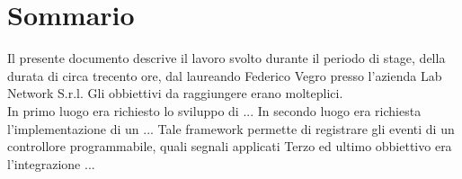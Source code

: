 
\cleardoublepage
{}
{}
\begingroup
\let\clearpage\relax
\let\cleardoublepage\relax
\let\cleardoublepage\relax

\chapter*{Sommario}

Il presente documento descrive il lavoro svolto durante il periodo di stage, della durata di circa trecento ore, dal laureando Federico Vegro presso l'azienda Lab Network S.r.l.
Gli obbiettivi da raggiungere erano molteplici.\\
In primo luogo era richiesto lo sviluppo di ...
In secondo luogo era richiesta l'implementazione di un ... 
Tale framework permette di registrare gli eventi di un controllore programmabile, quali segnali applicati 
Terzo ed ultimo obbiettivo era l'integrazione ...

%
%

\endgroup			

\vfill

